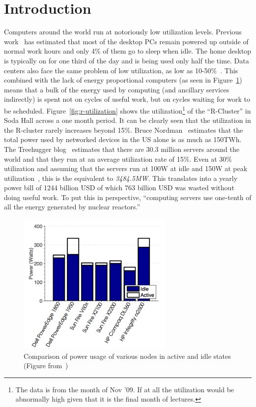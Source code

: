 \section{Introduction} %
\label{sec:introduction}
Computers around the world run at notoriously low utilization levels. Previous work~\cite{Kurt:07,Judy:04} has estimated that most of the desktop PCs remain powered up outside of normal work hours and only 4\% of them go to sleep when idle. The home desktop is typically on for one third of the day and is being used only half the time. Data centers also face the same problem of low utilization, as low as 10-50\%~\cite{Luiz:07,Albert:09}. This combined with the lack of energy proportional computers (as seen in Figure~\ref{fig:active-idle-power}) means that a bulk of the energy used by computing (and ancillary services indirectly) is spent not on cycles of useful work, but on cycles waiting for work to be scheduled. Figure~\ref{fig:r-utilization} shows the utilization\footnote{The data is from the month of Nov '09. If at all the utilization would be abnormally high given that it is the final month of lectures.} of the ``R-Cluster'' in Soda Hall across a one month period. It can be clearly seen that the utilization in the R-cluster rarely increases beyond 15\%. Bruce Nordman~\cite{Bruce:08} estimates that the total power used by networked devices in the US alone is as much as 150TWh. The Treehugger blog~\cite{TreeHugger:08} estimates that there are 30.3 million servers around the world and that they run at an average utilization rate of 15\%. Even at 30\% utilization and assuming that the servers run at 100W at idle and 150W at peak utilization~\cite{Yuvraj:09}, this is the equivalent to {\em 3484.5MW}. This translates into a yearly power bill of 1244 billion USD of which 763 billion USD was wasted without doing useful work. To put this in perspective, ``computing servers use one-tenth of all the energy generated by nuclear reactors.''~\cite{Robert:06}

\begin{figure}[ht]
\centering
\begin{center}
\includegraphics[width=3.0in]{graphs/steve-TR-idle-active.pdf}
\vspace{-0.1in}
\caption{{\normalsize Comparison of power usage of various nodes in active and idle states (Figure from~\cite{Dawson-Haggerty:09})}\label{fig:active-idle-power}}
\vspace{-0.1in}
\end{center}
\end{figure}

